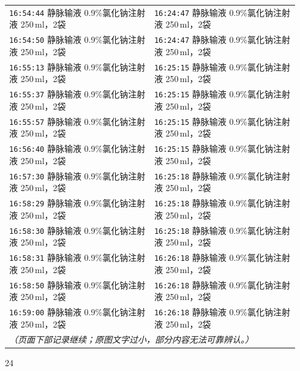 \documentclass[UTF8,10pt,a4paper,fontset=fandol]{ctexart}
\newcommand{\handwritten}[1]{#1}
\begin{document}
\begin{small}
\begin{tabular}{p{0.47\linewidth}p{0.47\linewidth}}
\\
\texttt{16:54:44} \quad 静脉输液 0.9\%氯化钠注射液 250\,ml，2袋
&
\texttt{16:24:47} \quad 静脉输液 0.9\%氯化钠注射液 250\,ml，2袋
\\
\texttt{16:54:50} \quad 静脉输液 0.9\%氯化钠注射液 250\,ml，2袋
&
\texttt{16:24:47} \quad 静脉输液 0.9\%氯化钠注射液 250\,ml，2袋
\\
\texttt{16:55:13} \quad 静脉输液 0.9\%氯化钠注射液 250\,ml，2袋
&
\texttt{16:25:15} \quad 静脉输液 0.9\%氯化钠注射液 250\,ml，2袋
\\
\texttt{16:55:37} \quad 静脉输液 0.9\%氯化钠注射液 250\,ml，2袋
&
\texttt{16:25:15} \quad 静脉输液 0.9\%氯化钠注射液 250\,ml，2袋
\\
\texttt{16:55:57} \quad 静脉输液 0.9\%氯化钠注射液 250\,ml，2袋
&
\texttt{16:25:15} \quad 静脉输液 0.9\%氯化钠注射液 250\,ml，2袋
\\
\texttt{16:56:40} \quad 静脉输液 0.9\%氯化钠注射液 250\,ml，2袋
&
\texttt{16:25:15} \quad 静脉输液 0.9\%氯化钠注射液 250\,ml，2袋
\\
\texttt{16:57:30} \quad 静脉输液 0.9\%氯化钠注射液 250\,ml，2袋
&
\texttt{16:25:18} \quad 静脉输液 0.9\%氯化钠注射液 250\,ml，2袋
\\
\texttt{16:58:29} \quad 静脉输液 0.9\%氯化钠注射液 250\,ml，2袋
&
\texttt{16:25:18} \quad 静脉输液 0.9\%氯化钠注射液 250\,ml，2袋
\\
\texttt{16:58:30} \quad 静脉输液 0.9\%氯化钠注射液 250\,ml，2袋
&
\texttt{16:25:18} \quad 静脉输液 0.9\%氯化钠注射液 250\,ml，2袋
\\
\texttt{16:58:31} \quad 静脉输液 0.9\%氯化钠注射液 250\,ml，2袋
&
\texttt{16:26:18} \quad 静脉输液 0.9\%氯化钠注射液 250\,ml，2袋
\\
\texttt{16:58:50} \quad 静脉输液 0.9\%氯化钠注射液 250\,ml，2袋
&
\texttt{16:26:18} \quad 静脉输液 0.9\%氯化钠注射液 250\,ml，2袋
\\
\texttt{16:59:00} \quad 静脉输液 0.9\%氯化钠注射液 250\,ml，2袋
&
\texttt{16:26:18} \quad 静脉输液 0.9\%氯化钠注射液 250\,ml，2袋
\\
\multicolumn{2}{l}{\textit{（页面下部记录继续；原图文字过小，部分内容无法可靠辨认。）}}\\
\end{tabular}
\end{small}

\handwritten{24}

\newpage
\end{document}
